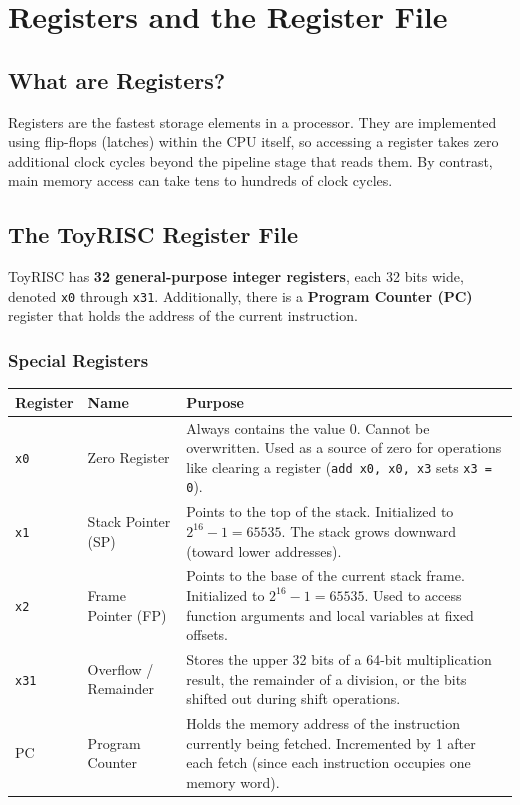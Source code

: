 \documentclass[12pt,a4paper]{article}
\begin{document}
\section{Registers and the Register File}

\subsection{What are Registers?}

Registers are the fastest storage elements in a processor. They are implemented using flip-flops (latches) within the CPU itself, so accessing a register takes zero additional clock cycles beyond the pipeline stage that reads them. By contrast, main memory access can take tens to hundreds of clock cycles.

\subsection{The ToyRISC Register File}

ToyRISC has \textbf{32 general-purpose integer registers}, each 32 bits wide, denoted \texttt{x0} through \texttt{x31}. Additionally, there is a \textbf{Program Counter (PC)} register that holds the address of the current instruction.

\subsubsection{Special Registers}

\begin{longtable}{p{2cm}p{3cm}p{8cm}}
\toprule
\textbf{Register} & \textbf{Name} & \textbf{Purpose} \\
\midrule
\texttt{x0} & Zero Register & Always contains the value 0. Cannot be overwritten. Used as a source of zero for operations like clearing a register (\texttt{add x0, x0, x3} sets \texttt{x3 = 0}). \\
\texttt{x1} & Stack Pointer (SP) & Points to the top of the stack. Initialized to $2^{16} - 1 = 65535$. The stack grows downward (toward lower addresses). \\
\texttt{x2} & Frame Pointer (FP) & Points to the base of the current stack frame. Initialized to $2^{16} - 1 = 65535$. Used to access function arguments and local variables at fixed offsets. \\
\texttt{x31} & Overflow / Remainder & Stores the upper 32 bits of a 64-bit multiplication result, the remainder of a division, or the bits shifted out during shift operations. \\
PC & Program Counter & Holds the memory address of the instruction currently being fetched. Incremented by 1 after each fetch (since each instruction occupies one memory word). \\
\bottomrule
\end{longtable}
\end{document}
